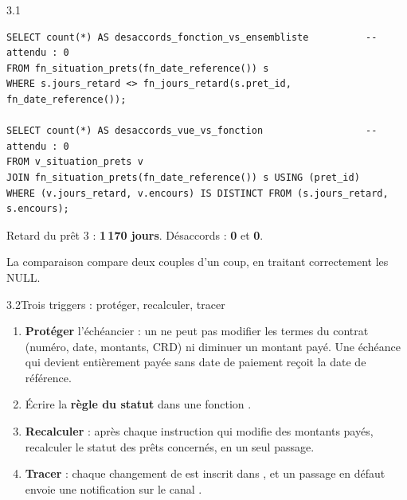 \begin{correction}{3.1}
\begin{lstlisting}[style=long]
SELECT count(*) AS desaccords_fonction_vs_ensembliste          -- attendu : 0
FROM fn_situation_prets(fn_date_reference()) s
WHERE s.jours_retard <> fn_jours_retard(s.pret_id, fn_date_reference());

SELECT count(*) AS desaccords_vue_vs_fonction                  -- attendu : 0
FROM v_situation_prets v
JOIN fn_situation_prets(fn_date_reference()) s USING (pret_id)
WHERE (v.jours_retard, v.encours) IS DISTINCT FROM (s.jours_retard, s.encours);
\end{lstlisting}

\begin{resultat}
Retard du prêt 3 : \textbf{1\,170 jours}. Désaccords : \textbf{0} et \textbf{0}.
\end{resultat}
La comparaison  compare deux couples d'un coup, en traitant
correctement les NULL.
\end{correction}

\begin{exercice}{3.2}{Trois triggers : protéger, recalculer, tracer}
\begin{enumerate}[label=\alph*)]
\item \textbf{Protéger} l'échéancier : un  ne peut pas modifier les termes du contrat
(numéro, date, montants, CRD) ni diminuer un montant payé. Une échéance qui devient entièrement payée
sans date de paiement reçoit la date de référence.
\item Écrire la \textbf{règle du statut} dans une fonction .
\item \textbf{Recalculer} : après chaque instruction qui modifie des montants payés, recalculer le
statut des prêts concernés, en un seul passage.
\item \textbf{Tracer} : chaque changement de  est inscrit dans ,
et un passage en défaut envoie une notification sur le canal .
\end{enumerate}
\end{exercice}

